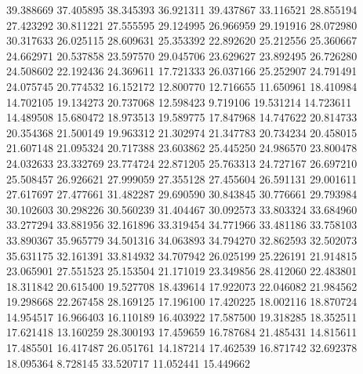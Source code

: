 39.388669
37.405895
38.345393
36.921311
39.437867
33.116521
28.855194
27.423292
30.811221
27.555595
29.124995
26.966959
29.191916
28.072980
30.317633
26.025115
28.609631
25.353392
22.892620
25.212556
25.360667
24.662971
20.537858
23.597570
29.045706
23.629627
23.892495
26.726280
24.508602
22.192436
24.369611
17.721333
26.037166
25.252907
24.791491
24.075745
20.774532
16.152172
12.800770
12.716655
11.650961
18.410984
14.702105
19.134273
20.737068
12.598423
9.719106
19.531214
14.723611
14.489508
15.680472
18.973513
19.589775
17.847968
14.747622
20.814733
20.354368
21.500149
19.963312
21.302974
21.347783
20.734234
20.458015
21.607148
21.095324
20.717388
23.603862
25.445250
24.986570
23.800478
24.032633
23.332769
23.774724
22.871205
25.763313
24.727167
26.697210
25.508457
26.926621
27.999059
27.355128
27.455604
26.591131
29.001611
27.617697
27.477661
31.482287
29.690590
30.843845
30.776661
29.793984
30.102603
30.298226
30.560239
31.404467
30.092573
33.803324
33.684960
33.277294
33.881956
32.161896
33.319454
34.771966
33.481186
33.758103
33.890367
35.965779
34.501316
34.063893
34.794270
32.862593
32.502073
35.631175
32.161391
33.814932
34.707942
26.025199
25.226191
21.914815
23.065901
27.551523
25.153504
21.171019
23.349856
28.412060
22.483801
18.311842
20.615400
19.527708
18.439614
17.922073
22.046082
21.984562
19.298668
22.267458
28.169125
17.196100
17.420225
18.002116
18.870724
14.954517
16.966403
16.110189
16.403922
17.587500
19.318285
18.352511
17.621418
13.160259
28.300193
17.459659
16.787684
21.485431
14.815611
17.485501
16.417487
26.051761
14.187214
17.462539
16.871742
32.692378
18.095364
8.728145
33.520717
11.052441
15.449662
